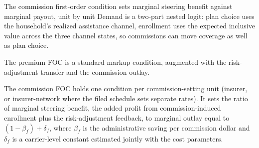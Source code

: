 \documentclass[aspectratio=169,11pt]{beamer}
\begin{document}
\begin{frame}{The commission first-order condition sets marginal steering benefit against marginal payout, unit by unit}
  Demand is a two-part nested logit: plan choice uses the household's realized assistance channel, enrollment uses the expected inclusive value across the three channel states, so commissions can move coverage as well as plan choice.

  \vspace{0.3cm}
  The premium FOC is a standard markup condition, augmented with the risk-adjustment transfer and the commission outlay.

  \vspace{0.3cm}
  The commission FOC holds one condition per commission-setting unit (insurer, or insurer-network where the filed schedule sets separate rates). It sets the ratio of marginal steering benefit, the added profit from commission-induced enrollment plus the risk-adjustment feedback, to marginal outlay equal to $(1-\beta_f) + \delta_f$, where $\beta_f$ is the administrative saving per commission dollar and $\delta_f$ is a carrier-level constant estimated jointly with the cost parameters.
\end{frame}

\end{document}
